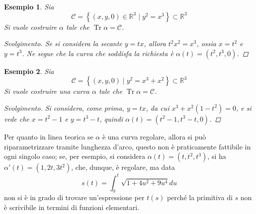 \documentclass[12pt]{scrartcl}
\theoremstyle{style}
\newtheorem{esempio}{Esempio}[section]
\newenvironment{svolgimento}{\renewcommand\qedsymbol{$\blacksquare$}\begin{proof}[Svolgimento]}{\end{proof}}
\numberwithin{equation}{subsection}
\begin{document}
\begin{esempio}
Sia 
\[
\mathcal{C}  = \left\{ (x,y,0) \in \mathbb{R}^3  \mid y^2 = x^3 \right\}  \subset \mathbb{R}^3
\] 
Si vuole costruire $\alpha $ tale che $\operatorname{Tr}\alpha  = \mathcal{C} $.
\begin{svolgimento}
	Se si considera la secante $y = tx$, allora $t^2 x^2 = x^3$, ossia $x= t^2$ e $y = t^3$.
	Ne segue che la curva che soddisfa la richiesta \`e $\alpha (t) = (t^2 , t^3,0)$.
\end{svolgimento}
\end{esempio}
\begin{esempio}
Sia 
\[
\mathcal{C}  = \left\{ (x,y,0)  \mid y^2 = x^3 + x^2 \right\} \subset \mathbb{R}^3
\] 
Si vuole costruire una curva $\alpha $ tale che $\operatorname{Tr} \alpha  = \mathcal{C} $.
\begin{svolgimento}
	Si considera, come prima, $y=tx $, da cui $x^3 + x^2(1-t^2) = 0$, e si vede che $x = t^2 - 1$ e $y=t^3 -t$, quindi $\alpha (t) = (t^2 - 1, t^3-t,0)$.
\end{svolgimento}
\end{esempio}
\noindent Per quanto in linea teorica se $\alpha $ \`e una curva regolare, allora si pu\`o riparametrizzare tramite lunghezza d'arco, questo non \`e praticamente fattibile in ogni singolo caso; se, per esempio, si considera $\alpha (t) = (t,t^2,t^3)$, si ha $\alpha '(t) = (1,2t,3t^2)$, che, dunque, \`e regolare, ma data
\[
s(t) = \int_{0} ^t \sqrt{1 + 4u^2 + 9u^4} du
\] 
non si \`e in grado di trovare un'espressione per $t(s)$ perch\'e la primitiva di $s$ non \`e scrivibile in termini di funzioni elementari.
\end{document}
